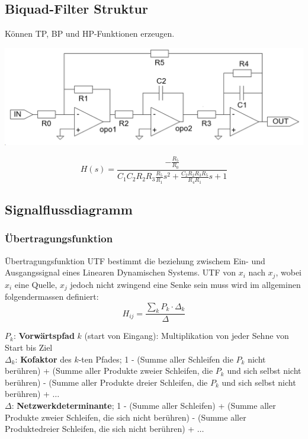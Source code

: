 \subsection{Biquad-Filter Struktur}
Können TP, BP und HP-Funktionen erzeugen.
\begin{center}
	\includegraphics[width=\columnwidth]{Images/biquad}
\end{center}
\[
H(s) = \frac{-\frac{R_5}{R_0}}{C_1C_2R_2R_3\frac{R_5}{R_1}s^2 + \frac{C_2R_2R_3R_5}{R_4R_1}s + 1}
\]

\subsection{Signalflussdiagramm}
\subsubsection{Übertragungsfunktion}
Übertragungsfunktion UTF bestimmt die beziehung zwischem Ein- und Ausgangssignal eines Linearen Dynamischen Systems. UTF von $x_i$ nach $x_j$, wobei $x_i$ eine Quelle, $x_j$ jedoch nicht zwingend eine Senke sein muss wird im allgeminen folgendermassen definiert:
\[
H_{ij} = \frac{\sum_{k} P_{k}\cdot \Delta_k}{\Delta}
\]

\noindent$P_k$: \textbf{Vorwärtspfad} $k$ (start von Eingang): Multiplikation von jeder Sehne von Start bis Ziel\\
$\Delta_k$: \textbf{Kofaktor} des $k$-ten Pfades; 1 - (Summe aller Schleifen die $P_k$ nicht berühren) + (Summe aller Produkte zweier Schleifen, die $P_k$ und sich selbst nicht berühren) - (Summe aller Produkte dreier Schleifen, die $P_k$ und sich selbst nicht berühren) + $\dots$\\
$\Delta$: \textbf{Netzwerkdeterminante}; 1 - (Summe aller Schleifen) + (Summe aller Produkte zweier Schleifen, die sich nicht berühren) - (Summe aller Produktedreier Schleifen, die sich nicht berühren) + $\dots$\\

